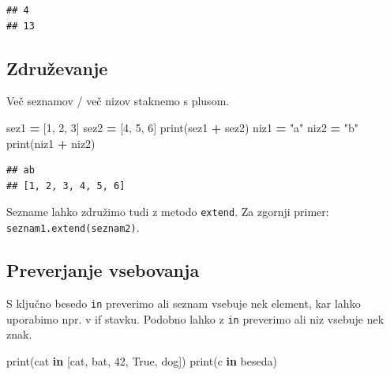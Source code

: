 \documentclass[
]{report}
\newenvironment{Shaded}{\begin{snugshade}}{\end{snugshade}}
\newcommand{\BuiltInTok}[1]{#1}
\newcommand{\DecValTok}[1]{\textcolor[rgb]{0.00,0.00,0.81}{#1}}
\newcommand{\KeywordTok}[1]{\textcolor[rgb]{0.13,0.29,0.53}{\textbf{#1}}}
\newcommand{\NormalTok}[1]{#1}
\newcommand{\OperatorTok}[1]{\textcolor[rgb]{0.81,0.36,0.00}{\textbf{#1}}}
\newcommand{\StringTok}[1]{\textcolor[rgb]{0.31,0.60,0.02}{#1}}
\newcommand{\VariableTok}[1]{\textcolor[rgb]{0.00,0.00,0.00}{#1}}
\begin{document}
\begin{verbatim}
## 4
## 13
\end{verbatim}

\hypertarget{zdruux17eevanje}{%
\subsection{Združevanje}\label{zdruux17eevanje}}

Več seznamov / več nizov staknemo s plusom.

\begin{Shaded}
\begin{Highlighting}[]
\NormalTok{sez1 }\OperatorTok{=}\NormalTok{ [}\DecValTok{1}\NormalTok{, }\DecValTok{2}\NormalTok{, }\DecValTok{3}\NormalTok{]}
\NormalTok{sez2 }\OperatorTok{=}\NormalTok{ [}\DecValTok{4}\NormalTok{, }\DecValTok{5}\NormalTok{, }\DecValTok{6}\NormalTok{]}
\BuiltInTok{print}\NormalTok{(sez1 }\OperatorTok{+}\NormalTok{ sez2)}
\NormalTok{niz1 }\OperatorTok{=} \StringTok{"a"}
\NormalTok{niz2 }\OperatorTok{=} \StringTok{"b"}
\BuiltInTok{print}\NormalTok{(niz1 }\OperatorTok{+}\NormalTok{ niz2)}
\end{Highlighting}
\end{Shaded}

\begin{verbatim}
## ab
## [1, 2, 3, 4, 5, 6]
\end{verbatim}

Sezname lahko združimo tudi z metodo \texttt{extend}. Za zgornji primer: \texttt{seznam1.extend(seznam2)}.

\hypertarget{preverjanje-vsebovanja}{%
\subsection{Preverjanje vsebovanja}\label{preverjanje-vsebovanja}}

S ključno besedo \texttt{in} preverimo ali seznam vsebuje nek element, kar lahko uporabimo npr. v if stavku. Podobno lahko z \texttt{in} preverimo ali niz vsebuje nek znak.

\begin{Shaded}
\begin{Highlighting}[]
\BuiltInTok{print}\NormalTok{(}\StringTok{\textquotesingle{}cat\textquotesingle{}} \KeywordTok{in}\NormalTok{ [}\StringTok{\textquotesingle{}cat\textquotesingle{}}\NormalTok{, }\StringTok{\textquotesingle{}bat\textquotesingle{}}\NormalTok{, }\DecValTok{42}\NormalTok{, }\VariableTok{True}\NormalTok{, }\StringTok{\textquotesingle{}dog\textquotesingle{}}\NormalTok{])}
\BuiltInTok{print}\NormalTok{(}\StringTok{\textquotesingle{}c\textquotesingle{}} \KeywordTok{in} \StringTok{\textquotesingle{}beseda\textquotesingle{}}\NormalTok{)}
\end{Highlighting}
\end{Shaded}
\end{document}
